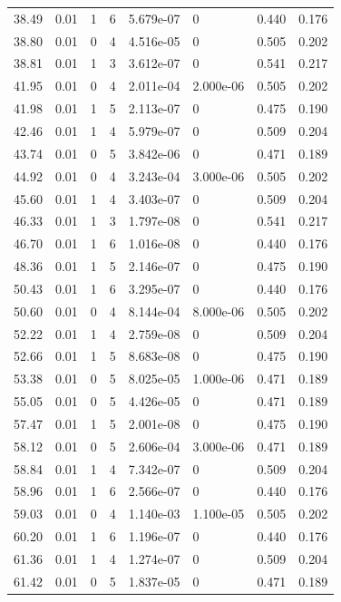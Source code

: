 \documentclass[preview]{standalone}
\begin{document}
{{{\begin{tabular}{L{1.2cm}C{1.2cm} C{0.3cm}C{0.5cm} C{1.4cm}C{1.4cm} C{1.4cm}C{1.4cm}}
  38.49  &  0.01  & 1     &  6 &  5.679e-07  & 0  & 0.440 &  0.176   \\ 
  38.80  &  0.01  & 0     &  4 &  4.516e-05  & 0  & 0.505 &  0.202   \\ 
  38.81  &  0.01  & 1     &  3 &  3.612e-07  & 0  & 0.541 &  0.217   \\ 
  41.95  &  0.01  & 0     &  4 &  2.011e-04  & 2.000e-06  & 0.505 &  0.202   \\ 
  41.98  &  0.01  & 1     &  5 &  2.113e-07  & 0  & 0.475 &  0.190   \\ 
  42.46  &  0.01  & 1     &  4 &  5.979e-07  & 0  & 0.509 &  0.204   \\ 
  43.74  &  0.01  & 0     &  5 &  3.842e-06  & 0  & 0.471 &  0.189   \\ 
  44.92  &  0.01  & 0     &  4 &  3.243e-04  & 3.000e-06  & 0.505 &  0.202   \\ 
  45.60  &  0.01  & 1     &  4 &  3.403e-07  & 0  & 0.509 &  0.204   \\ 
  46.33  &  0.01  & 1     &  3 &  1.797e-08  & 0  & 0.541 &  0.217   \\ 
  46.70  &  0.01  & 1     &  6 &  1.016e-08  & 0  & 0.440 &  0.176   \\ 
  48.36  &  0.01  & 1     &  5 &  2.146e-07  & 0  & 0.475 &  0.190   \\ 
  50.43  &  0.01  & 1     &  6 &  3.295e-07  & 0  & 0.440 &  0.176   \\ 
  50.60  &  0.01  & 0     &  4 &  8.144e-04  & 8.000e-06  & 0.505 &  0.202   \\ 
  52.22  &  0.01  & 1     &  4 &  2.759e-08  & 0  & 0.509 &  0.204   \\ 
  52.66  &  0.01  & 1     &  5 &  8.683e-08  & 0  & 0.475 &  0.190   \\ 
  53.38  &  0.01  & 0     &  5 &  8.025e-05  & 1.000e-06  & 0.471 &  0.189   \\ 
  55.05  &  0.01  & 0     &  5 &  4.426e-05  & 0  & 0.471 &  0.189   \\ 
  57.47  &  0.01  & 1     &  5 &  2.001e-08  & 0  & 0.475 &  0.190   \\ 
  58.12  &  0.01  & 0     &  5 &  2.606e-04  & 3.000e-06  & 0.471 &  0.189   \\ 
  58.84  &  0.01  & 1     &  4 &  7.342e-07  & 0  & 0.509 &  0.204   \\ 
  58.96  &  0.01  & 1     &  6 &  2.566e-07  & 0  & 0.440 &  0.176   \\ 
  59.03  &  0.01  & 0     &  4 &  1.140e-03  & 1.100e-05  & 0.505 &  0.202   \\ 
  60.20  &  0.01  & 1     &  6 &  1.196e-07  & 0  & 0.440 &  0.176   \\ 
  61.36  &  0.01  & 1     &  4 &  1.274e-07  & 0  & 0.509 &  0.204   \\ 
  61.42  &  0.01  & 0     &  5 &  1.837e-05  & 0  & 0.471 &  0.189   \\ 
\hline 
\end{tabular} 

}}}
\end{document}
